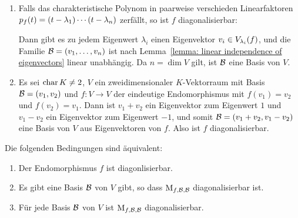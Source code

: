 \begin{example}
  \begin{enumerate}
    \item
      Falls das charakteristische Polynom in paarweise verschieden Linearfaktoren $\charpol{f}(t) = (t - \lambda_1) \dotsm (t - \lambda_n)$ zerfällt, so ist $f$ diagonalisierbar:
      
      Dann gibt es zu jedem Eigenwert $\lambda_i$ einen Eigenvektor $v_i \in \eigenspace{V}{f}{\lambda_i}$, und die Familie $\basis{B} = (v_1, \dotsc, v_n)$ ist nach Lemma~\ref{lemma: linear independence of eigenvectors} linear unabhängig.
      Da $n = \dim V$ gilt, ist $\basis{B}$ eine Basis von $V$.
      
    \item
      Es sei $\ringchar{K} \neq 2$, $V$ ein zweidimensionaler $K$-Vektorraum mit Basis $\basis{B} = (v_1, v_2)$ und $f \colon V \to V$ der eindeutige Endomorphismus mit $f(v_1) = v_2$ und $f(v_2) = v_1$.
      Dann ist $v_1 + v_2$ ein Eigenvektor zum Eigenwert $1$ und $v_1 - v_2$ ein Eigenvektor zum Eigenwert $-1$, und somit $\basis{B} = (v_1 + v_2, v_1 - v_2)$  eine Basis von $V$ aus Eigenvektoren von $f$.
      Also ist $f$ diagonalisierbar.
  \end{enumerate}
\end{example}

\begin{lemma}
  Die folgenden Bedingungen sind äquivalent:
  \begin{enumerate}
    \item
      Der Endomorphismus $f$ ist diagonlisierbar.
    \item
      Es gibt eine Basis $\basis{B}$ von $V$ gibt, so dass $\repmatrixendo{f}{\basis{B}}$ diagonalisierbar ist.
    \item
      Für jede Basis $\basis{B}$ von $V$ ist $\repmatrixendo{f}{\basis{B}}$ diagonalisierbar.
  \end{enumerate}
\end{lemma}

